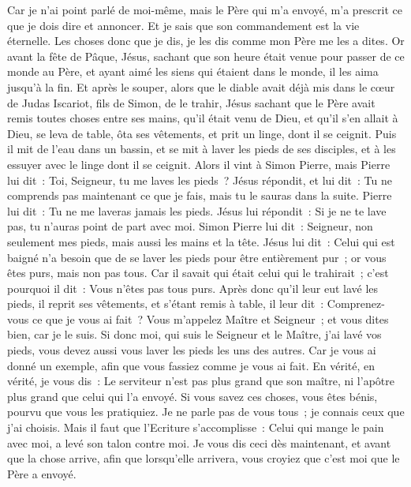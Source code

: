 \begin{multicols}{2}
Car je n'ai point parlé de moi-même, mais le Père qui m'a envoyé, m'a prescrit ce que je dois dire et annoncer.
Et je sais que son commandement est la vie éternelle. Les choses donc que je dis, je les dis comme mon Père me les a dites.
\VerseOne{}Or avant la fête de Pâque, Jésus, sachant que son heure était venue pour passer de ce monde au Père, et ayant aimé les siens qui étaient dans le monde, il les aima jusqu'à la fin.
Et après le souper, alors que le diable avait déjà mis dans le cœur de Judas Iscariot, fils de Simon, de le trahir,
Jésus sachant que le Père avait remis toutes choses entre ses mains, qu'il était venu de Dieu, et qu'il s'en allait à Dieu,
se leva de table, ôta ses vêtements, et prit un linge, dont il se ceignit.
Puis il mit de l'eau dans un bassin, et se mit à laver les pieds de ses disciples, et à les essuyer avec le linge dont il se ceignit.
Alors il vint à Simon Pierre, mais Pierre lui dit~: Toi, Seigneur, tu me laves les pieds~?
Jésus répondit, et lui dit~: Tu ne comprends pas maintenant ce que je fais, mais tu le sauras dans la suite.
Pierre lui dit~: Tu ne me laveras jamais les pieds. Jésus lui répondit~: Si je ne te lave pas, tu n'auras point de part avec moi.
Simon Pierre lui dit~: Seigneur, non seulement mes pieds, mais aussi les mains et la tête.
Jésus lui dit~: Celui qui est baigné n'a besoin que de se laver les pieds pour être entièrement pur~; or vous êtes purs, mais non pas tous.
Car il savait qui était celui qui le trahirait~; c'est pourquoi il dit~: Vous n'êtes pas tous purs.
Après donc qu'il leur eut lavé les pieds, il reprit ses vêtements, et s'étant remis à table, il leur dit~: Comprenez-vous ce que je vous ai fait~?
Vous m'appelez Maître et Seigneur~; et vous dites bien, car je le suis.
Si donc moi, qui suis le Seigneur et le Maître, j'ai lavé vos pieds, vous devez aussi vous laver les pieds les uns des autres.
Car je vous ai donné un exemple, afin que vous fassiez comme je vous ai fait.
En vérité, en vérité, je vous dis~: Le serviteur n'est pas plus grand que son maître, ni l'apôtre plus grand que celui qui l'a envoyé.
Si vous savez ces choses, vous êtes bénis, pourvu que vous les pratiquiez.
Je ne parle pas de vous tous~; je connais ceux que j'ai choisis. Mais il faut que l'Ecriture s'accomplisse~: Celui qui mange le pain avec moi, a levé son talon contre moi.
Je vous dis ceci dès maintenant, et avant que la chose arrive, afin que lorsqu'elle arrivera, vous croyiez que c'est moi que le Père a envoyé.

\end{multicols}
